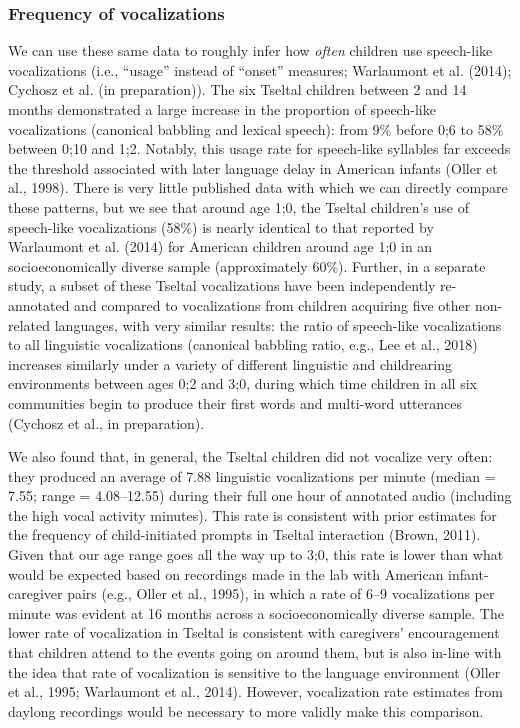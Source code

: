 \documentclass[floatsintext,man]{apa6}
\theoremstyle{definition}
\theoremstyle{definition}
\theoremstyle{definition}
\theoremstyle{remark}
\begin{document}
\subsubsection{Frequency of
vocalizations}\label{frequency-of-vocalizations}

We can use these same data to roughly infer how \emph{often} children
use speech-like vocalizations (i.e., \enquote{usage} instead of
\enquote{onset} measures; Warlaumont et al. (2014); Cychosz et al. (in
preparation)). The six Tseltal children between 2 and 14 months
demonstrated a large increase in the proportion of speech-like
vocalizations (canonical babbling and lexical speech): from 9\% before
0;6 to 58\% between 0;10 and 1;2. Notably, this usage rate for
speech-like syllables far exceeds the threshold associated with later
language delay in American infants (Oller et al., 1998). There is very
little published data with which we can directly compare these patterns,
but we see that around age 1;0, the Tseltal children's use of
speech-like vocalizations (58\%) is nearly identical to that reported by
Warlaumont et al. (2014) for American children around age 1;0 in an
socioeconomically diverse sample (approximately 60\%). Further, in a
separate study, a subset of these Tseltal vocalizations have been
independently re-annotated and compared to vocalizations from children
acquiring five other non-related languages, with very similar results:
the ratio of speech-like vocalizations to all linguistic vocalizations
(canonical babbling ratio, e.g., Lee et al., 2018) increases similarly
under a variety of different linguistic and childrearing environments
between ages 0;2 and 3;0, during which time children in all six
communities begin to produce their first words and multi-word utterances
(Cychosz et al., in preparation).

We also found that, in general, the Tseltal children did not vocalize
very often: they produced an average of 7.88 linguistic vocalizations
per minute (median = 7.55; range = 4.08--12.55) during their full one
hour of annotated audio (including the high vocal activity minutes).
This rate is consistent with prior estimates for the frequency of
child-initiated prompts in Tseltal interaction (Brown, 2011). Given that
our age range goes all the way up to 3;0, this rate is lower than what
would be expected based on recordings made in the lab with American
infant-caregiver pairs (e.g., Oller et al., 1995), in which a rate of
6--9 vocalizations per minute was evident at 16 months across a
socioeconomically diverse sample. The lower rate of vocalization in
Tseltal is consistent with caregivers' encouragement that children
attend to the events going on around them, but is also in-line with the
idea that rate of vocalization is sensitive to the language environment
(Oller et al., 1995; Warlaumont et al., 2014). However, vocalization
rate estimates from daylong recordings would be necessary to more
validly make this comparison.
\end{document}
